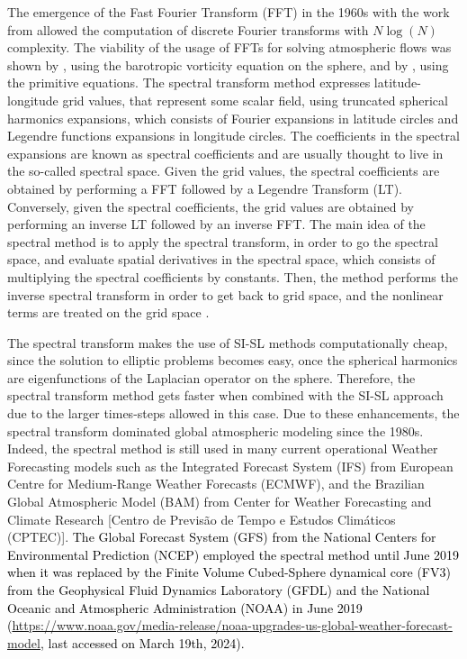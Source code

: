 The emergence of the Fast Fourier Transform (FFT) in the 1960s with the work from 
\citet{cooley:1965} allowed the computation of discrete Fourier transforms with
$N\log(N)$ complexity. 
The viability of the usage of FFTs for solving atmospheric flows was shown by \citet{orszag:1970},
using the barotropic vorticity equation on the sphere, and by \citet{eliasen:1970}, using
the primitive equations.
The spectral transform method expresses latitude-longitude grid values, that represent some scalar field,
using truncated spherical harmonics expansions, which consists of Fourier expansions 
in latitude circles and Legendre functions expansions in longitude circles. 
The coefficients in the spectral expansions are known
as spectral coefficients and are usually thought to live in the so-called spectral space.
Given the grid values, the spectral coefficients are obtained by performing a FFT followed by a 
Legendre Transform (LT). 
Conversely, given the spectral coefficients,
the grid values are obtained by performing an inverse LT followed by an inverse FFT.
The main idea of the spectral method is to apply the spectral transform, in order to 
go the spectral space, and evaluate spatial derivatives in the spectral space, which
consists of multiplying the spectral coefficients by constants. 
Then, the method performs the inverse spectral transform
in order to get back to grid space, and the nonlinear terms are treated on the grid space
\citep{krishnamurti:2006}.

The spectral transform makes the use of SI-SL methods computationally cheap, 
since the solution to elliptic problems becomes easy, once the spherical harmonics are
eigenfunctions of the Laplacian operator on the sphere.
Therefore, the spectral transform method gets faster when combined with the SI-SL approach
due to the larger times-steps allowed in this case.
Due to these enhancements, the spectral transform dominated global atmospheric modeling 
\citep{randall:2018} since the 1980s.
Indeed, the spectral method is still used in many current operational Weather Forecasting models such as
the Integrated Forecast System (IFS) from  European Centre for Medium-Range Weather Forecasts (ECMWF), and the
Brazilian Global Atmospheric Model (BAM) \citep{figueroa:2016} from  Center for Weather Forecasting 
and Climate Research [Centro de Previsão de Tempo e Estudos Climáticos (CPTEC)].
\textcolor{black}{The Global Forecast System (GFS) from the National Centers for Environmental Prediction (NCEP) 
employed the spectral method until June 2019 when it was replaced by the Finite Volume Cubed-Sphere dynamical core (FV3) 
from the Geophysical Fluid Dynamics Laboratory (GFDL) and the National Oceanic and Atmospheric Administration (NOAA) in June 2019 
(\url{https://www.noaa.gov/media-release/noaa-upgrades-us-global-weather-forecast-model}, last accessed on March 19th, 2024).}

